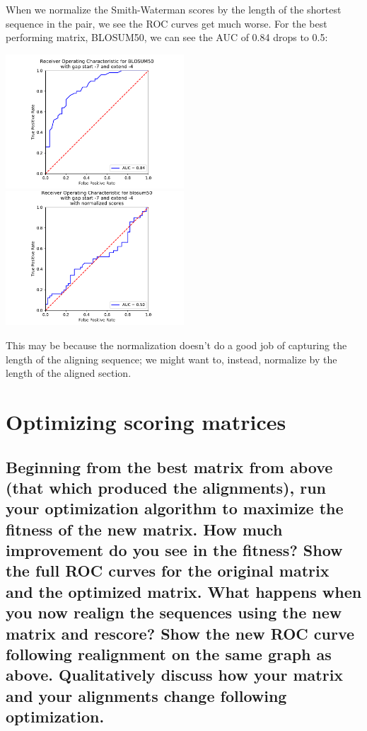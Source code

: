 \documentclass[]{article}
\begin{document}
When we normalize the Smith-Waterman scores by the length of the shortest sequence in the pair, we see the ROC curves get much worse. For the best performing matrix, BLOSUM50, we can see the AUC of 0.84 drops to 0.5:

\vspace{1em}
\includegraphics[width=0.5\textwidth]{../BMI203_HW3_alignment/plots/ROC_blosum50.pdf}
\includegraphics[width=0.5\textwidth]{../BMI203_HW3_alignment/plots/ROC_normScores_blosum50.pdf}
\vspace{1em}

This may be because the normalization doesn't do a good job of capturing the length of the aligning sequence; we might want to, instead, normalize by the length of the aligned section.

\section{Optimizing scoring matrices}
\setcounter{subsection}{1}
\subsection{Beginning from the best matrix from above (that which produced the alignments), run your optimization algorithm to maximize the fitness of the new matrix. How much improvement do you see in the fitness? Show the full ROC curves for the original matrix and the optimized matrix. What happens when you now realign the sequences using the new matrix and rescore? Show the new ROC curve following realignment on the same graph as above. Qualitatively discuss how your matrix and your alignments change following optimization.}
\end{document}
